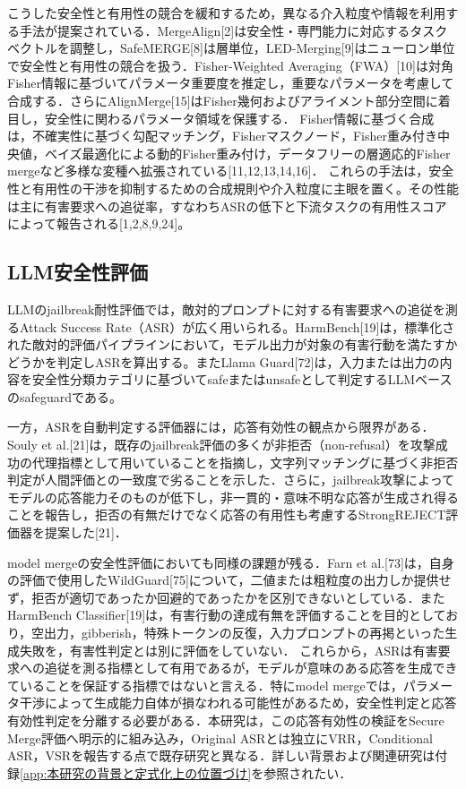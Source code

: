 \documentclass{article}
\begin{document}
こうした安全性と有用性の競合を緩和するため，異なる介入粒度や情報を利用する手法が提案されている．MergeAlign[2]は安全性・専門能力に対応するタスクベクトルを調整し，SafeMERGE[8]は層単位，LED-Merging[9]はニューロン単位で安全性と有用性の競合を扱う．Fisher-Weighted Averaging（FWA）[10]は対角Fisher情報に基づいてパラメータ重要度を推定し，重要なパラメータを考慮して合成する．さらにAlignMerge[15]はFisher幾何およびアライメント部分空間に着目し，安全性に関わるパラメータ領域を保護する．
\color{red}
Fisher情報に基づく合成は，不確実性に基づく勾配マッチング，Fisherマスクノード，Fisher重み付き中央値，ベイズ最適化による動的Fisher重み付け，データフリーの層適応的Fisher mergeなど多様な変種へ拡張されている[11,12,13,14,16]．
\color{black}
これらの手法は，安全性と有用性の干渉を抑制するための合成規則や介入粒度に主眼を置く。その性能は主に有害要求への追従率，すなわちASRの低下と下流タスクの有用性スコアによって報告される[1,2,8,9,24]。

\subsection{LLM安全性評価}
LLMのjailbreak耐性評価では，敵対的プロンプトに対する有害要求への追従を測るAttack Success Rate（ASR）が広く用いられる。HarmBench[19]は，標準化された敵対的評価パイプラインにおいて，モデル出力が対象の有害行動を満たすかどうかを判定しASRを算出する。またLlama Guard[72]は，入力または出力の内容を安全性分類カテゴリに基づいてsafeまたはunsafeとして判定するLLMベースのsafeguardである。

一方，ASRを自動判定する評価器には，応答有効性の観点から限界がある．Souly et al.[21]は，既存のjailbreak評価の多くが非拒否（non-refusal）を攻撃成功の代理指標として用いていることを指摘し，文字列マッチングに基づく非拒否判定が人間評価との一致度で劣ることを示した．さらに，jailbreak攻撃によってモデルの応答能力そのものが低下し，非一貫的・意味不明な応答が生成され得ることを報告し，拒否の有無だけでなく応答の有用性も考慮するStrongREJECT評価器を提案した[21]．


model mergeの安全性評価においても同様の課題が残る．Farn et al.[73]は，自身の評価で使用したWildGuard[75]について，二値または粗粒度の出力しか提供せず，拒否が適切であったか回避的であったかを区別できないとしている．またHarmBench Classifier[19]は，有害行動の達成有無を評価することを目的としており，空出力，gibberish，特殊トークンの反復，入力プロンプトの再掲といった生成失敗を，有害性判定とは別に評価をしていない．
これらから，ASRは有害要求への追従を測る指標として有用であるが，モデルが意味のある応答を生成できていることを保証する指標ではないと言える．特にmodel mergeでは，パラメータ干渉によって生成能力自体が損なわれる可能性があるため，安全性判定と応答有効性判定を分離する必要がある．本研究は，この応答有効性の検証をSecure Merge評価へ明示的に組み込み，Original ASRとは独立にVRR，Conditional ASR，VSRを報告する点で既存研究と異なる．詳しい背景および関連研究は付録\ref{app:本研究の背景と定式化上の位置づけ}を参照されたい．
\end{document}
